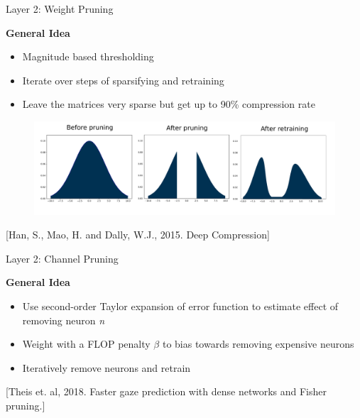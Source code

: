\documentclass[xcolor=dvipsnames]{beamer}
\begin{document}
\begin{frame}{Layer 2: Weight Pruning}

{\large\textbf{General Idea}}

\begin{itemize}
    \item Magnitude based thresholding 
    \item Iterate over steps of sparsifying and retraining 
    \item Leave the matrices very sparse but get up to 90\% compression rate
\end{itemize}

\begin{figure}
    \centering
    \includegraphics[width=\linewidth]{images/prune_retrain.pdf}
\end{figure}

{\footnotesize [Han, S., Mao, H. and Dally, W.J., 2015. Deep Compression]}
    
\end{frame}


\begin{frame}{Layer 2: Channel Pruning}
    
{\large\textbf{General Idea}}
\begin{itemize}
    \item Use second-order Taylor expansion of error function to estimate effect of removing neuron \textit{n}
    \item Weight with a FLOP penalty $\beta$ to bias towards removing expensive neurons
    \item Iteratively remove neurons and retrain
\end{itemize}


\vspace{2cm}

{\footnotesize [Theis et. al, 2018. Faster gaze prediction with dense networks and Fisher pruning.]}
    
\end{frame}
\end{document}
